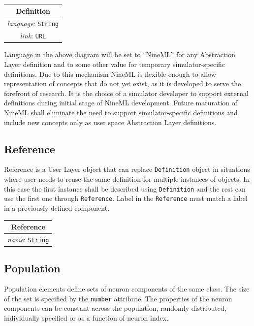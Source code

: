 \documentclass[draftspec]{ninemlspec}
\begin{document}
\begin{table}[htb]
\center
\begin{tabular}{|c|}
\hline
\hline
Definition \\
\hline
\hline
{\em language}: {\tt String} \\
\hline
{\em link}: {\tt URL}\\
\hline
\end{tabular}
\end{table}

Language in the above diagram will be set to ``NineML'' for any Abstraction
Layer definition and to some other value for temporary simulator-specific
definitions. Due to this mechanism
NineML is flexible enough to allow representation of concepts that do not
yet exist, as it is developed to serve the forefront of research.
It is the choice of a simulator developer to support external definitions
during initial stage of NineML development. Future maturation of NineML shall
eliminate the need to support simulator-specific definitions and include new
concepts only as user space Abstraction Layer definitions.

\subsection{Reference}

Reference is a User Layer object that can replace {\tt Definition} object
in situations where user needs to reuse the same definition for multiple
instances of objects. In this case the first instance shall be described using
{\tt Definition} and the rest can use the first one through {\tt Reference}.
Label in the {\tt Reference} must match a label in a previously defined
component.

\begin{table}[htb]
\center
\begin{tabular}{|c|}
\hline
\hline
Reference \\
\hline
\hline
{\em name}: {\tt String} \\
\hline
\end{tabular}
\end{table}

\subsection{Population}

Population elements define sets of neuron components of the same class. The size of the set is specified by the {\tt number} attribute. The properties of the neuron components can be constant across the population, randomly distributed, individually specified or as a function of neuron index.  
\end{document}
